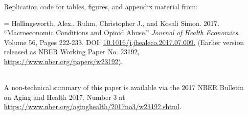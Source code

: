 \documentclass[12pt]{article}
\begin{document}
\begin{center}
Replication code for tables, figures, and appendix material from:
\end{center}

\hangindent=\parindent
{}
\noindent
Hollingsworth, Alex., Ruhm, Christopher J., and Kosali Simon. 2017. ``Macroeconomic Conditions and Opioid Abuse.'' \emph{Journal of Health Economics}. Volume 56, Pages 222-233. DOI: \href{https://doi.org/10.1016/j.jhealeco.2017.07.009}{10.1016/j.jhealeco.2017.07.009.} (Earlier version released as NBER Working Paper No. 23192, \href{https://www.nber.org/papers/w23192}{https://www.nber.org/papers/w23192}).

~\\
 \noindent A non-technical summary of this paper is available via the 2017 NBER Bulletin on Aging and Health 2017, Number 3 at \href{https://www.nber.org/aginghealth/2017no3/w23192.shtml}{https://www.nber.org/aginghealth/2017no3/w23192.shtml}.

\newpage
   \begin{singlespace}
   \tableofcontents
    \listoffigures
    \listoftables
   \end{singlespace}
\newpage

\end{document}

